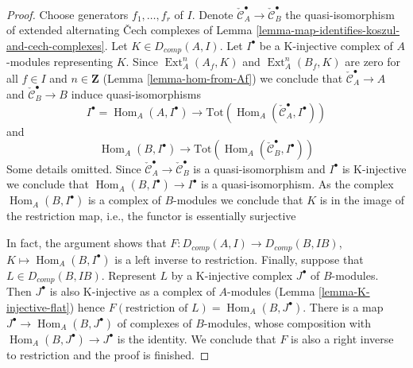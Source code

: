 \documentclass[10pt,a4paper]{amsart}
\theoremstyle{plain}
\theoremstyle{definition}
\theoremstyle{remark}
\numberwithin{equation}{subsection}
\def\Hom{\mathop{\mathrm{Hom}}\nolimits}
\def\Ext{\mathop{\mathrm{Ext}}\nolimits}
\begin{document}
\begin{proof}
Choose generators $f_1, \ldots, f_r$ of $I$.
Denote $\check{\mathcal{C}}^\bullet_A \to \check{\mathcal{C}}^\bullet_B$
the quasi-isomorphism of extended alternating {\v C}ech complexes of
Lemma \ref{lemma-map-identifies-koszul-and-cech-complexes}.
Let $K \in D_{comp}(A, I)$. Let $I^\bullet$ be a K-injective
complex of $A$-modules representing $K$. Since $\Ext^n_A(A_f, K)$
and $\Ext^n_A(B_f, K)$ are zero for all $f \in I$ and
$n \in \mathbf{Z}$ (Lemma \ref{lemma-hom-from-Af}) we conclude that
$\check{\mathcal{C}}^\bullet_A \to A$ and
$\check{\mathcal{C}}^\bullet_B \to B$ induce quasi-isomorphisms
$$
I^\bullet = \Hom_A(A, I^\bullet) \longrightarrow
\text{Tot}(\Hom_A(\check{\mathcal{C}}^\bullet_A, I^\bullet))
$$
and
$$
\Hom_A(B, I^\bullet) \longrightarrow
\text{Tot}(\Hom_A(\check{\mathcal{C}}^\bullet_B, I^\bullet))
$$
Some details omitted.
Since $\check{\mathcal{C}}^\bullet_A \to \check{\mathcal{C}}^\bullet_B$
is a quasi-isomorphism and $I^\bullet$ is K-injective we conclude
that $\Hom_A(B, I^\bullet) \to I^\bullet$ is a quasi-isomorphism.
As the complex $\Hom_A(B, I^\bullet)$ is a complex of $B$-modules
we conclude that $K$ is in the image of the restriction map, i.e.,
the functor is essentially surjective

\medskip\noindent
In fact, the argument shows that
$F : D_{comp}(A, I) \to D_{comp}(B, IB)$, $K \mapsto \Hom_A(B, I^\bullet)$
is a left inverse to restriction. Finally, suppose that
$L \in D_{comp}(B, IB)$. Represent $L$ by a K-injective complex
$J^\bullet$ of $B$-modules.
Then $J^\bullet$ is also K-injective as a complex of $A$-modules
(Lemma \ref{lemma-K-injective-flat}) hence
$F(\text{restriction of }L) = \Hom_A(B, J^\bullet)$.
There is a map $J^\bullet \to \Hom_A(B, J^\bullet)$
of complexes of $B$-modules, whose composition with
$\Hom_A(B, J^\bullet) \to J^\bullet$ is the identity.
We conclude that $F$ is also a right inverse to restriction
and the proof is finished.
\end{proof}
\end{document}
